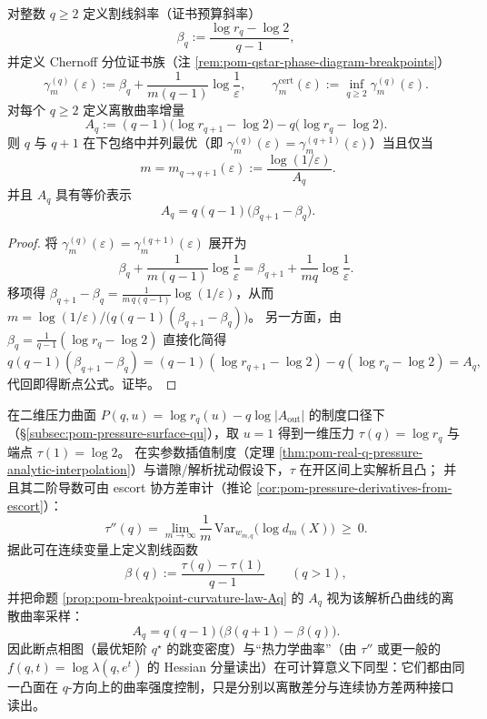 
\begin{proposition}\label{prop:pom-breakpoint-curvature-law-Aq}
对整数 \(q\ge 2\) 定义割线斜率（证书预算斜率）
\[
\beta_q:=\frac{\log r_q-\log 2}{q-1},
\]
并定义 Chernoff 分位证书族（注 \ref{rem:pom-qstar-phase-diagram-breakpoints}）
\[
\gamma_m^{(q)}(\varepsilon):=\beta_q+\frac{1}{m(q-1)}\log\frac{1}{\varepsilon},
\qquad
\gamma_m^{\mathrm{cert}}(\varepsilon):=\inf_{q\ge 2}\gamma_m^{(q)}(\varepsilon).
\]
对每个 \(q\ge 2\) 定义离散曲率增量
\[
\boxed{\;
A_q:=(q-1)\bigl(\log r_{q+1}-\log 2\bigr)-q\bigl(\log r_q-\log 2\bigr).\;}
\]
则 \(q\) 与 \(q+1\) 在下包络中并列最优（即 \(\gamma_m^{(q)}(\varepsilon)=\gamma_m^{(q+1)}(\varepsilon)\)）当且仅当
\[
\boxed{\;
m=m_{q\to q+1}(\varepsilon):=\frac{\log(1/\varepsilon)}{A_q}.}
\]
并且 \(A_q\) 具有等价表示
\[
\boxed{\;
A_q=q(q-1)\bigl(\beta_{q+1}-\beta_q\bigr).}
\]
\end{proposition}
\begin{proof}
将 \(\gamma_m^{(q)}(\varepsilon)=\gamma_m^{(q+1)}(\varepsilon)\) 展开为
\[
\beta_q+\frac{1}{m(q-1)}\log\frac{1}{\varepsilon}
=
\beta_{q+1}+\frac{1}{mq}\log\frac{1}{\varepsilon}.
\]
移项得
\(
\beta_{q+1}-\beta_q=\frac{1}{m\,q(q-1)}\log(1/\varepsilon)
\)，从而
\(
m=\log(1/\varepsilon)/\bigl(q(q-1)(\beta_{q+1}-\beta_q)\bigr)
\)。
另一方面，由 \(\beta_q=\frac{1}{q-1}(\log r_q-\log 2)\) 直接化简得
\[
q(q-1)(\beta_{q+1}-\beta_q)
=(q-1)(\log r_{q+1}-\log 2)-q(\log r_q-\log 2)
=A_q,
\]
代回即得断点公式。证毕。
\end{proof}

\begin{remark}\label{rem:pom-breakpoint-curvature-thermo-realization}
在二维压力曲面 \(P(q,u)=\log r_q(u)-q\log|A_{\mathrm{out}}|\) 的制度口径下（\S\ref{subsec:pom-pressure-surface-qu}），取 \(u=1\) 得到一维压力 \(\tau(q)=\log r_q\) 与端点 \(\tau(1)=\log 2\)。
在实参数插值制度（定理 \ref{thm:pom-real-q-pressure-analytic-interpolation}）与谱隙/解析扰动假设下，\(\tau\) 在开区间上实解析且凸；
并且其二阶导数可由 escort 协方差审计（推论 \ref{cor:pom-pressure-derivatives-from-escort}）：
\[
\tau''(q)=\lim_{m\to\infty}\frac{1}{m}\,\mathrm{Var}_{w_{m,q}}\!\bigl(\log d_m(X)\bigr)\ \ge\ 0.
\]
据此可在连续变量上定义割线函数
\[
\beta(q):=\frac{\tau(q)-\tau(1)}{q-1}\qquad(q>1),
\]
并把命题 \ref{prop:pom-breakpoint-curvature-law-Aq} 的 \(A_q\) 视为该解析凸曲线的离散曲率采样：
\[
A_q=q(q-1)\bigl(\beta(q+1)-\beta(q)\bigr).
\]
因此断点相图（最优矩阶 \(q^\star\) 的跳变密度）与“热力学曲率”（由 \(\tau''\) 或更一般的 \(f(q,t)=\log\lambda(q,e^t)\) 的 Hessian 分量读出）在可计算意义下同型：它们都由同一凸面在 \(q\)-方向上的曲率强度控制，只是分别以离散差分与连续协方差两种接口读出。
\end{remark}

